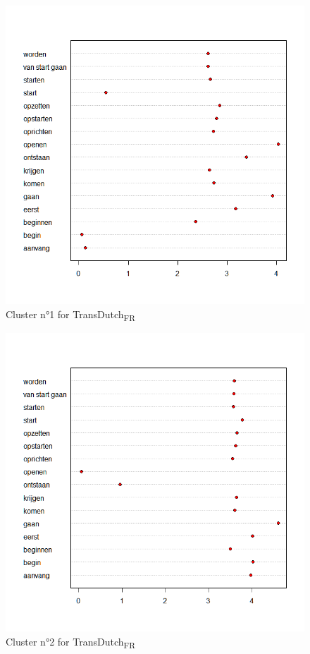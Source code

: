 \begin{figure}
\includegraphics[height=.4\textheight]{figures/Vandevoorde2-img82.png}
\caption{\label{fig:4:79}  Cluster n°1 for TransDutch\textsubscript{FR}}
\end{figure}

\begin{figure}
\includegraphics[height=.4\textheight]{figures/Vandevoorde2-img83.png}
\caption{\label{fig:4:80}  Cluster n°2 for TransDutch\textsubscript{FR}}
\end{figure}

